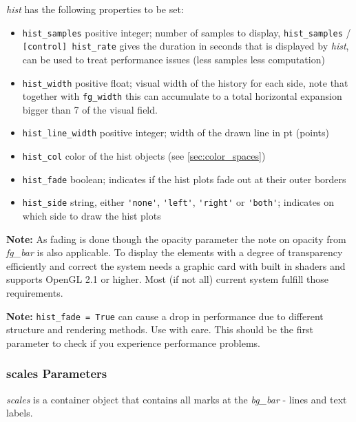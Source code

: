 \documentclass[12pt,a4paper]{book}
\begin{document}
\textit{hist} has the following properties to be set:
\begin{itemize}
\item \verb|hist_samples| positive integer; number of samples to display, \verb|hist_samples| / \verb|[control] hist_rate| gives the duration in seconds that is displayed by \textit{hist}, can be used to treat performance issues (less samples less computation)
\item \verb|hist_width| positive float; visual width of the history for each side, note that together with \verb|fg_width| this can accumulate to a total horizontal expansion bigger than 7 \degree of the visual field.
\item \verb|hist_line_width| positive integer; width of the drawn line in pt (points)
\item \verb|hist_col| color of the hist objects (see \ref{sec:color_spaces})
\item \verb|hist_fade| boolean; indicates if the hist plots fade out at their outer borders
\item \verb|hist_side| string, either \verb|'none'|, \verb|'left'|, \verb|'right'| or \verb|'both'|; indicates on which side to draw the hist plots
\end{itemize}


\textbf{Note:} As fading is done though the opacity parameter the note on opacity from \textit{fg\_bar} is also applicable. To display the elements with a degree of transparency efficiently and correct the system needs a graphic card with built in shaders and supports OpenGL 2.1 or higher. Most (if not all) current system fulfill those requirements.

\textbf{Note:} \verb|hist_fade = True| can cause a drop in performance due to different structure and rendering methods. Use with care. This should be the first parameter to check if you experience performance problems.

\subsubsection{scales Parameters}

\textit{scales} is a container object that contains all marks at the \textit{bg\_bar} - lines and text labels.
\end{document}
